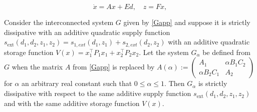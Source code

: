 \documentclass[10pt,a4paper]{amsart}
\begin{document}
\begin{equation}
\label{Gapp}
\dot{x}=Ax+Ed, \quad z=Fx,
\end{equation} 

\begin{lemma}
\label{Lemma1}
Consider the interconnected system $G$ given by \eqref{Gapp} and suppose it is strictly dissipative with an additive quadratic supply function 
$
s_{\text{ext}}(d_1,d_2,z_1,z_2)=s_{1,ext}(d_1,z_1)+s_{2,ext}(d_2,z_2)
$
with an additive quadratic storage function $V(x)=x_1^\top P_1 x_1+x_2^\top P_2 x_2$. Let the system $G_{\alpha}$ be defined from $G$ when the matrix $A$ from \eqref{Gapp} is replaced by $A(\alpha):=\left(\begin{smallmatrix}A_1 & \alpha B_1 C_2 \\ \alpha B_2 C_1 & A_2\end{smallmatrix}\right)$
for $\alpha$ an arbitrary real constant such that $0 \leq \alpha \leq 1$. Then $G_{\alpha}$ is strictly dissipative with respect to the same additive supply function $s_{\text{ext}}(d_1,d_2,z_1,z_2)$ and with the same additive storage function $V(x)$.
\end{lemma}
\end{document}
